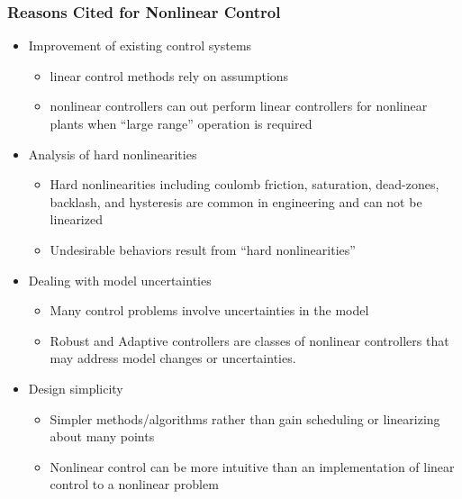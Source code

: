 \documentclass[show notes]{beamer}       %
\begin{document}
\begin{frame}
\frametitle{Reasons Cited for Nonlinear Control}
\begin{itemize}
\item Improvement of existing control systems
\begin{itemize}
\item linear control methods rely on assumptions
\item nonlinear controllers can out perform linear controllers for nonlinear plants when ``large range'' operation is required
\end{itemize}
\item Analysis of hard nonlinearities
\begin{itemize}
\item Hard nonlinearities including coulomb friction, saturation, dead-zones, backlash, and hysteresis are common in engineering and can not be linearized
\item Undesirable behaviors result from ``hard nonlinearities''
\end{itemize}
\item Dealing with model uncertainties
\begin{itemize}
\item Many control problems involve uncertainties in the model
\item Robust and Adaptive controllers are classes of nonlinear controllers that may address model changes or uncertainties.
\end{itemize}
\item Design simplicity
\begin{itemize}
\item Simpler methods/algorithms rather than gain scheduling or linearizing about many points
\item Nonlinear control can be more intuitive than an implementation of linear control to a nonlinear problem
\end{itemize}
\end{itemize}
\end{frame}
\end{document}
